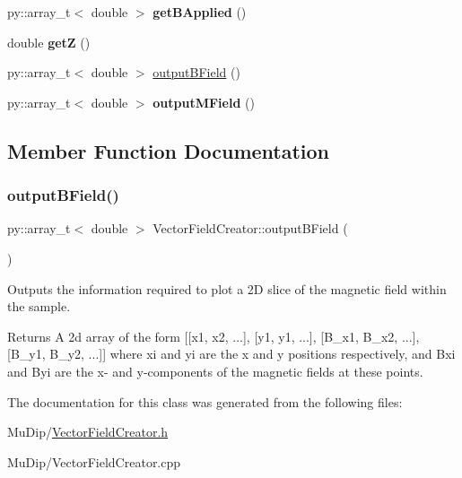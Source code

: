 \begin{DoxyCompactItemize}
\mbox{\label{class_vector_field_creator_a2ebb8dda70ea728bb7f85565f1bb592d}} 
py\+::array\+\_\+t$<$ double $>$ {\bfseries get\+B\+Applied} ()
\item 
\mbox{\label{class_vector_field_creator_aa50996f6517ccfaf82cb305afa61c63d}} 
double {\bfseries getZ} ()
\item 
py\+::array\+\_\+t$<$ double $>$ \mbox{\hyperlink{class_vector_field_creator_a160b37371b6853430e4d563920eca2e0}{output\+B\+Field}} ()
\item 
\mbox{\label{class_vector_field_creator_a15087c020366e469d259caa32118cdee}} 
py\+::array\+\_\+t$<$ double $>$ {\bfseries output\+M\+Field} ()
\end{DoxyCompactItemize}


\subsection{Member Function Documentation}
\mbox{\label{class_vector_field_creator_a160b37371b6853430e4d563920eca2e0}} 
\subsubsection{\texorpdfstring{output\+B\+Field()}{outputBField()}}
{\footnotesize\ttfamily py\+::array\+\_\+t$<$ double $>$ Vector\+Field\+Creator\+::output\+B\+Field (\begin{DoxyParamCaption}{ }\end{DoxyParamCaption})}

Outputs the information required to plot a 2D slice of the magnetic field within the sample. \begin{DoxyReturn}{Returns}
A 2d array of the form \mbox{[}\mbox{[}x1, x2, ...\mbox{]}, \mbox{[}y1, y1, ...\mbox{]}, \mbox{[}B\+\_\+x1, B\+\_\+x2, ...\mbox{]}, \mbox{[}B\+\_\+y1, B\+\_\+y2, ...\mbox{]}\mbox{]} where xi and yi are the x and y positions respectively, and Bxi and Byi are the x-\/ and y-\/components of the magnetic fields at these points. 
\end{DoxyReturn}


The documentation for this class was generated from the following files\+:\begin{DoxyCompactItemize}
\item 
Mu\+Dip/\mbox{\hyperlink{_vector_field_creator_8h}{Vector\+Field\+Creator.\+h}}\item 
Mu\+Dip/Vector\+Field\+Creator.\+cpp\end{DoxyCompactItemize}
